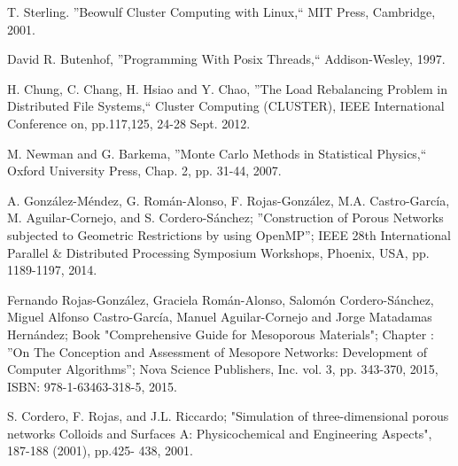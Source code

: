\begin{thebibliography}{9}
 T. Sterling. ''Beowulf Cluster Computing with Linux,`` MIT Press, Cambridge, 2001.

David R. Butenhof, ''Programming With Posix Threads,`` Addison-Wesley, 1997.

H. Chung, C. Chang, H. Hsiao and Y. Chao, ''The Load Rebalancing Problem in Distributed File Systems,`` Cluster Computing (CLUSTER), IEEE International Conference on, pp.117,125, 24-28 Sept. 2012.

M. Newman and G. Barkema, ''Monte Carlo Methods in Statistical Physics,`` Oxford University Press, Chap. 2, pp. 31-44, 2007.

A. Gonz\'alez-M\'endez, G. Rom\'an-Alonso, F. Rojas-Gonz\'alez, M.A. Castro-Garc\'ia, M. Aguilar-Cornejo, and S. Cordero-S\'anchez;
''Construction of Porous Networks subjected to Geometric Restrictions by using OpenMP''; IEEE 28th
International Parallel \& Distributed Processing Symposium Workshops, Phoenix, USA, pp. 1189-1197, 2014.


Fernando Rojas-Gonz\'alez, Graciela Rom\'an-Alonso, Salom\'on Cordero-S\'anchez, Miguel Alfonso Castro-Garc\'ia, Manuel Aguilar-Cornejo and Jorge Matadamas Hern\'andez; Book "Comprehensive Guide for Mesoporous Materials"; Chapter : ''On The Conception and Assessment of Mesopore Networks: Development of Computer Algorithms''; Nova Science Publishers, Inc. vol. 3, pp. 343-370, 2015, ISBN: 978-1-63463-318-5, 2015.

S. Cordero, F. Rojas, and J.L. Riccardo; "Simulation of three-dimensional porous networks Colloids and Surfaces A: Physicochemical and Engineering Aspects", 187-188 (2001), pp.425- 438, 2001.



\end{thebibliography}
